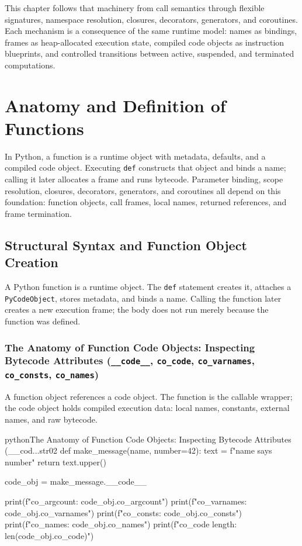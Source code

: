 \documentclass[a4paper,twoside]{report}
\begin{document}
This chapter follows that machinery from call semantics through flexible signatures, namespace resolution, closures, decorators, generators, and coroutines. Each mechanism is a consequence of the same runtime model: names as bindings, frames as heap-allocated execution state, compiled code objects as instruction blueprints, and controlled transitions between active, suspended, and terminated computations.


\section{Anatomy and Definition of Functions}

In Python, a function is a runtime object with metadata, defaults, and a compiled code object. Executing \texttt{def} constructs that object and binds a name; calling it later allocates a frame and runs bytecode. Parameter binding, scope resolution, closures, decorators, generators, and coroutines all depend on this foundation: function objects, call frames, local names, returned references, and frame termination.


\subsection{Structural Syntax and Function Object Creation}

A Python function is a runtime object. The \texttt{def} statement creates it, attaches a \texttt{PyCodeObject}, stores metadata, and binds a name. Calling the function later creates a new execution frame; the body does not run merely because the function was defined.

\subsubsection{The Anatomy of Function Code Objects: Inspecting Bytecode Attributes (\texttt{\_\_code\_\_}, \texttt{co\_code}, \texttt{co\_varnames}, \texttt{co\_consts}, \texttt{co\_names})}

A function object references a code object. The function is the callable wrapper; the code object holds compiled execution data: local names, constants, external names, and raw bytecode.

\begin{codebox}[]{python}{The Anatomy of Function Code Objects: Inspecting Bytecode Attributes (\_\_cod...}{str02}
def make_message(name, number=42):
    text = f"{name} says {number}"
    return text.upper()

code_obj = make_message.__code__

print(f"co_argcount:    {code_obj.co_argcount}")
print(f"co_varnames:    {code_obj.co_varnames}")
print(f"co_consts:      {code_obj.co_consts}")
print(f"co_names:       {code_obj.co_names}")
print(f"co_code length: {len(code_obj.co_code)}")
\end{codebox}
\end{document}
